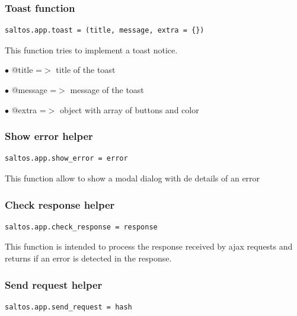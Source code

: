 \documentclass[a4paper]{article}
\begin{document}
\hypertarget{toc5}{}
\subsubsection{Toast function}

\begin{lstlisting}
saltos.app.toast = (title, message, extra = {})
\end{lstlisting}

This function tries to implement a toast notice.

\begin{compactitem}
\item[\color{myblue}$\bullet$] @title   =$>$ title of the toast
\item[\color{myblue}$\bullet$] @message =$>$ message of the toast
\item[\color{myblue}$\bullet$] @extra   =$>$ object with array of buttons and color
\end{compactitem}

\hypertarget{toc6}{}
\subsubsection{Show error helper}

\begin{lstlisting}
saltos.app.show_error = error
\end{lstlisting}

This function allow to show a modal dialog with de details of an error

\hypertarget{toc7}{}
\subsubsection{Check response helper}

\begin{lstlisting}
saltos.app.check_response = response
\end{lstlisting}

This function is intended to process the response received by ajax requests and returns
if an error is detected in the response.

\hypertarget{toc8}{}
\subsubsection{Send request helper}

\begin{lstlisting}
saltos.app.send_request = hash
\end{lstlisting}
\end{document}
